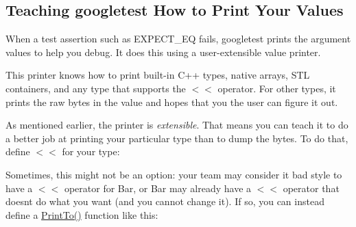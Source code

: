 \subsection*{Teaching googletest How to Print Your Values}

When a test assertion such as {\ttfamily E\+X\+P\+E\+C\+T\+\_\+\+EQ} fails, googletest prints the argument values to help you debug. It does this using a user-\/extensible value printer.

This printer knows how to print built-\/in C++ types, native arrays, S\+TL containers, and any type that supports the {\ttfamily $<$$<$} operator. For other types, it prints the raw bytes in the value and hopes that you the user can figure it out.

As mentioned earlier, the printer is {\itshape extensible}. That means you can teach it to do a better job at printing your particular type than to dump the bytes. To do that, define {\ttfamily $<$$<$} for your type\+:


\begin{DoxyCode}{0}
\DoxyCodeLine{}
\DoxyCodeLine{}
\DoxyCodeLine{  \}}
\DoxyCodeLine{\};}
\DoxyCodeLine{}
\DoxyCodeLine{\}}
\DoxyCodeLine{}
\end{DoxyCode}


Sometimes, this might not be an option\+: your team may consider it bad style to have a {\ttfamily $<$$<$} operator for {\ttfamily Bar}, or {\ttfamily Bar} may already have a {\ttfamily $<$$<$} operator that doesn\textquotesingle{}t do what you want (and you cannot change it). If so, you can instead define a {\ttfamily \mbox{\hyperlink{namespacetesting_1_1internal_adb3c27150dbe661db0e0c4be27533460}{Print\+To()}}} function like this\+:


